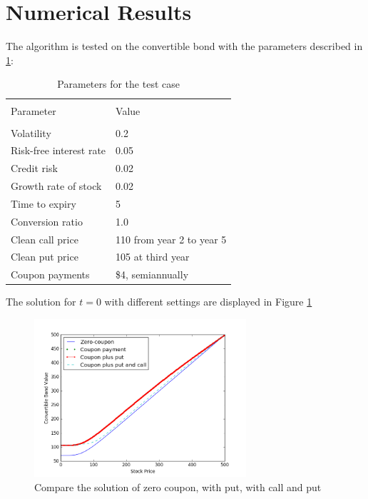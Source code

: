 \documentclass[12pt]{article}
\begin{document}
\section{Numerical Results}
The algorithm is tested on the convertible bond with the parameters described in \ref{tb:params}:
\begin{table}
\centering
\begin{tabular}{ll}
\hline\hline\\
Parameter &  Value \\
\hline\\
Volatility & 0.2 \\
Risk-free interest rate & 0.05\\
Credit risk & 0.02\\
Growth rate of stock & 0.02\\
Time to expiry & 5 \\
Conversion ratio & 1.0 \\
Clean call price & 110 from year 2 to year 5\\
Clean put price & 105 at third year\\
Coupon payments & \$4, semiannually\\
\hline
\end{tabular}
\caption{Parameters for the test case}
\label{tb:params}
\end{table}


The solution for $t = 0$ with different settings are displayed in Figure \ref{fig:compare}
\begin{figure}[h]
\centering
\includegraphics[width=0.7\textwidth]{Figures/compare}
\caption{Compare the solution of zero coupon, with put, with call and put}
\label{fig:compare}
\end{figure}
\end{document}
